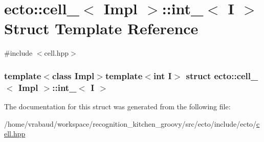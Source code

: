 \hypertarget{structecto_1_1cell___1_1int__}{\section{ecto\-:\-:cell\-\_\-$<$ \-Impl $>$\-:\-:int\-\_\-$<$ \-I $>$ \-Struct \-Template \-Reference}
\label{structecto_1_1cell___1_1int__}
}


{\ttfamily \#include $<$cell.\-hpp$>$}

\subsubsection*{template$<$class Impl$>$template$<$int \-I$>$ struct ecto\-::cell\-\_\-$<$ Impl $>$\-::int\-\_\-$<$ I $>$}



\-The documentation for this struct was generated from the following file\-:\begin{DoxyCompactItemize}
\item 
/home/vrabaud/workspace/recognition\-\_\-kitchen\-\_\-groovy/src/ecto/include/ecto/\hyperlink{cell_8hpp}{cell.\-hpp}\end{DoxyCompactItemize}
